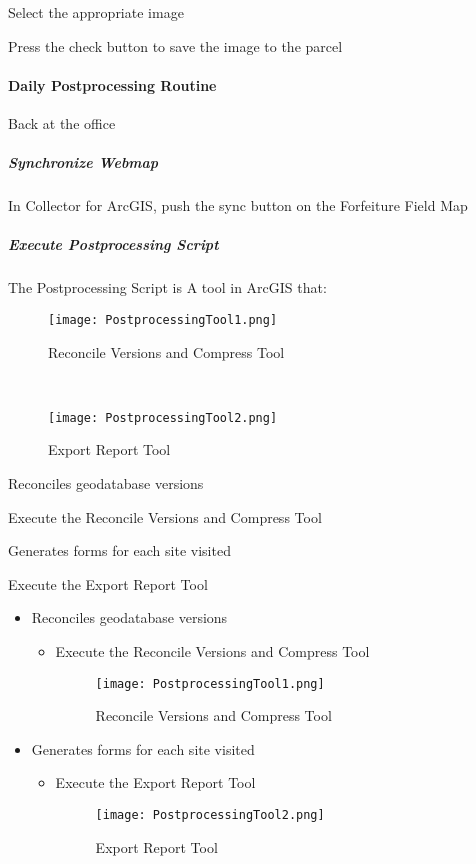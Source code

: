 \noindent Select the appropriate image
\vspace{2in}

\noindent Press the check button to save the image to the parcel
\clearpage
\paragraph[Daily Postprocessing Routine]{Daily Postprocessing Routine\texorpdfstring{\\}{}}
Back at the office
\subparagraph[Synchronize Webmap]{Synchronize Webmap\texorpdfstring{\\}{}}
In Collector for ArcGIS, push the sync button on the Forfeiture Field Map
\subparagraph[Execute Postprocessing Script]{Execute Postprocessing Script\texorpdfstring{\\}{}}
The Postprocessing Script is A tool in ArcGIS that:
\begin{wrapfigure}{r}{0.5\textwidth}
\centering
    \texttt{[image: PostprocessingTool1.png]}
\caption{Reconcile Versions and Compress Tool}
\vspace{.25in}

\HRule \\[.4cm] %
\vspace{.25in}

    \texttt{[image: PostprocessingTool2.png]}
\caption{Export Report Tool}
\end{wrapfigure}
Reconciles geodatabase versions
\vspace{1.5in}

Execute the Reconcile Versions and Compress Tool
\vspace{2in}

Generates forms for each site visited
\vspace{1.25in}

Execute the Export Report Tool
\clearpage
\begin{itemize}
\item Reconciles geodatabase versions
\begin{itemize}
\item Execute the Reconcile Versions and Compress Tool
\begin{figure}[h!]
\centering
    \texttt{[image: PostprocessingTool1.png]}
\caption{Reconcile Versions and Compress Tool}
\end{figure}
\end{itemize}
\item Generates forms for each site visited
\begin{itemize}
\item Execute the Export Report Tool
\begin{figure}[h!]
\centering
    \texttt{[image: PostprocessingTool2.png]}
\caption{Export Report Tool}
\end{figure}
\end{itemize}
\end{itemize}
\clearpage
